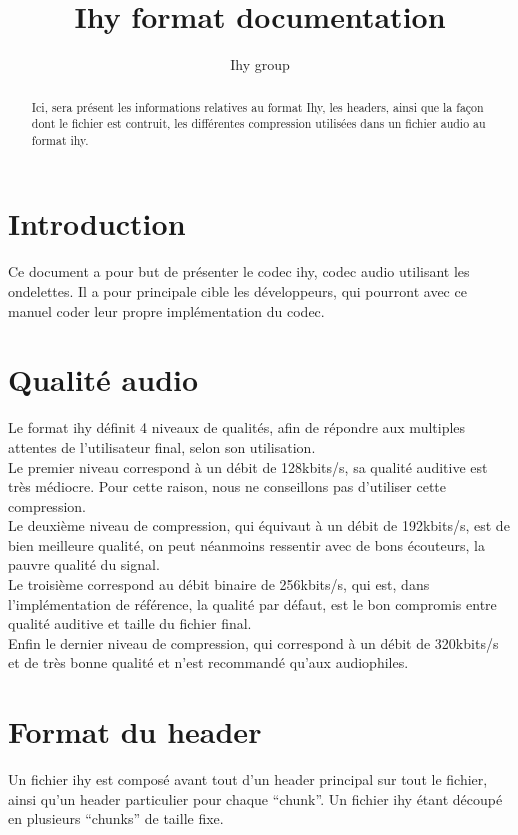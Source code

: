 \documentclass[a4paper,12pt]{article}
\title{Ihy format documentation}
\author{Ihy group}
\begin{document}
\maketitle

\begin{abstract}
Ici, sera présent les informations relatives au format Ihy, les headers, ainsi
que la façon dont le fichier est contruit, les différentes compression
utilisées dans un fichier audio au format ihy.
\end{abstract}

\tableofcontents

\section{Introduction}
Ce document a pour but de présenter le codec ihy, codec audio utilisant les
ondelettes. Il a pour principale cible les développeurs, qui pourront avec ce
manuel coder leur propre implémentation du codec.

\section{Qualité audio}
Le format ihy définit 4 niveaux de qualités, afin de répondre aux multiples
attentes de l'utilisateur final, selon son utilisation.\\
Le premier niveau correspond à un débit de 128kbits/s, sa qualité auditive est
très médiocre. Pour cette raison, nous ne conseillons pas d'utiliser cette
compression.\\
Le deuxième niveau de compression, qui équivaut à un débit de 192kbits/s, est de
bien meilleure qualité, on peut néanmoins ressentir avec de bons écouteurs, la
pauvre qualité du signal.\\
Le troisième correspond au débit binaire de 256kbits/s, qui est, dans
l'implémentation de référence, la qualité par défaut, est le bon compromis entre
qualité auditive et taille du fichier final.\\
Enfin le dernier niveau de compression, qui correspond à un débit de 320kbits/s
et de très bonne qualité et n'est recommandé qu'aux audiophiles.

\section{Format du header}
Un fichier ihy est composé avant tout d'un header principal sur tout le fichier,
ainsi qu'un header particulier pour chaque ``chunk''. Un fichier ihy étant
découpé en plusieurs ``chunks'' de taille fixe.\\
\end{document}
